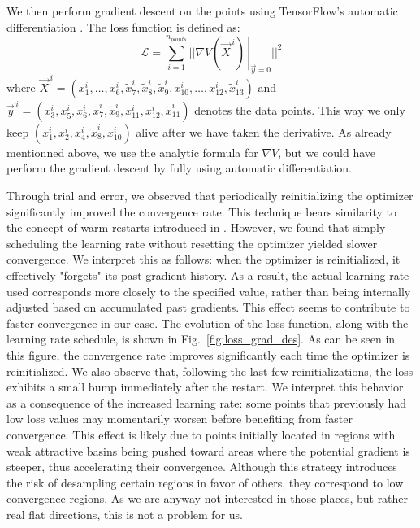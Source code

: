 \documentclass[11pt]{article}
\begin{document}
		We then perform gradient descent on the points using TensorFlow’s automatic differentiation \cite{tensorflow2015-whitepaper}. The loss function is defined as:
		\begin{equation}
			\mathcal{L} = \sum_{i = 1}^{n_{points}} ||\left.\nabla V(\vec{X}^{\,i})\,\right|_{\vec{y}=0}||^2
		\end{equation}
		where $\vec{X}^{\,i} = (x^i_1,\dots,x^i_6,\tilde{x}^i_7,\tilde{x}^i_8,\tilde{x}^i_9,x^i_{10},\dots,x^i_{12},\tilde{x}^i_{13})$ and $\vec{y}^{\,i} = (x^i_3,x^i_5,x^i_6,\tilde{x}^i_7,\tilde{x}^i_9,x^i_{11},x^i_{12},\tilde{x}^i_{11})$ denotes the data points. This way we only keep $(x^i_1,x^i_2,x^i_4,\tilde{x}^i_8,x^i_{10})$ alive after we have taken the derivative. As already mentionned above, we use the analytic formula for $\nabla V$, but we could have perform the gradient descent by fully using automatic differentiation.
		
		Through trial and error, we observed that periodically reinitializing the optimizer significantly improved the convergence rate. This technique bears similarity to the concept of warm restarts introduced in \cite{loshchilov2017sgdrstochasticgradientdescent}. However, we found that simply scheduling the learning rate without resetting the optimizer yielded slower convergence. We interpret this as follows: when the optimizer is reinitialized, it effectively "forgets" its past gradient history. As a result, the actual learning rate used corresponds more closely to the specified value, rather than being internally adjusted based on accumulated past gradients. This effect seems to contribute to faster convergence in our case.  The evolution of the loss function, along with the learning rate schedule, is shown in Fig.~\eqref{fig:loss_grad_des}. As can be seen in this figure, the convergence rate improves significantly each time the optimizer is reinitialized. We also observe that, following the last few reinitializations, the loss exhibits a small bump immediately after the restart. We interpret this behavior as a consequence of the increased learning rate: some points that previously had low loss values may momentarily worsen before benefiting from faster convergence. This effect is likely due to points initially located in regions with weak attractive basins being pushed toward areas where the potential gradient is steeper, thus accelerating their convergence. Although this strategy introduces the risk of desampling certain regions in favor of others, they correspond to low convergence regions. As we are anyway not interested in those places, but rather real flat directions, this is not a problem for us. 
		
\end{document}
